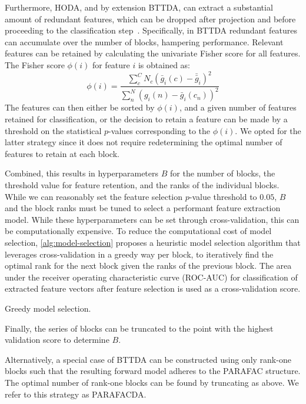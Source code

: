 Furthermore, HODA, and by extension BTTDA, can extract a substantial amount
of redundant features, which can be dropped after projection and before proceeding to the classification
step~\cite{Phan2010}.
Specifically, in BTTDA redundant features can accumulate over the number of
blocks, hampering performance.
Relevant features can be retained by calculating the
univariate Fisher score for all features.
The Fisher score $\phi(i)$ for feature $i$ is obtained as:
\begin{equation}
	\phi(i) = \frac
	{\sum_c^C N_c \left(\bar{g}_i(c)-\bar{\bar{g}}_i\right)^2}
	{\sum_n^N \left(g_i(n)-\bar{g}_i(c_n)\right)^2}
\end{equation}
The features can then either be sorted by $\phi(i)$, and a given number of
features retained for classification, or the decision to retain a feature can
be made by a threshold on the statistical $p$-values corresponding to the
$\phi(i)$.
We opted for the latter strategy since it does not require redetermining the
optimal number of features to retain at each block.

Combined, this results in hyperparameters $B$ for the number of blocks, the
threshold value for feature retention, and the ranks of the individual blocks.
While we can reasonably set the feature selection $p$-value threshold to $0.05$,
$B$ and the block ranks must be tuned to select a performant feature extraction
model.
While these hyperparameters can be set through cross-validation, this can be
computationally expensive.
To reduce the computational cost of model selection,
\cref{alg:model-selection} proposes a heuristic model selection
algorithm that leverages cross-validation in a greedy way per block, to
iteratively find the optimal rank for the next block given the ranks of the
previous block.
The area under the receiver operating characteristic curve (ROC-AUC) for
classification of extracted feature vectors after feature selection is used as
a cross-validation score.
\begin{algorithm}
  \caption[Greedy model selection procedure.]{Greedy model selection.}
	\label{alg:model-selection}
	
\end{algorithm}
Finally, the series of blocks can be truncated to the point with
the highest validation score to determine $B$.

Alternatively, a special case of BTTDA can be constructed using only rank-one
blocks such that the resulting forward model adheres to the PARAFAC structure.
The optimal number of rank-one blocks can be found by truncating as above.
We refer to this strategy as PARAFACDA.

